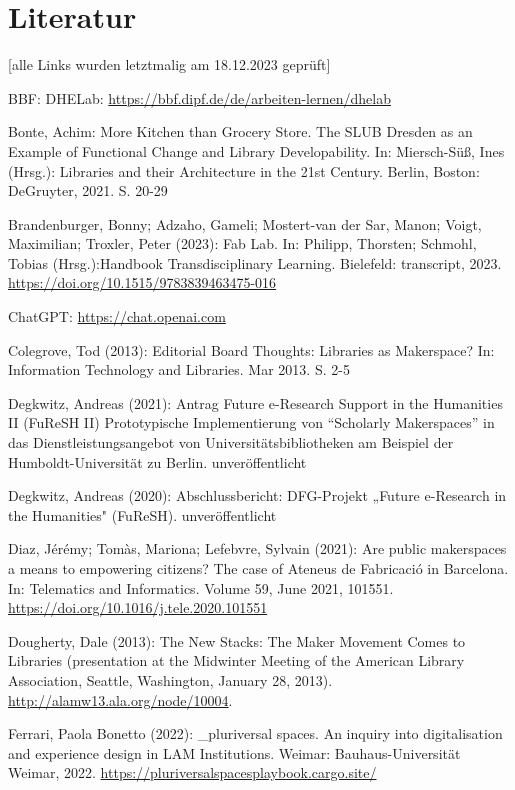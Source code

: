 \documentclass[a4paper,
fontsize=11pt,
oneside,
numbers=noperiodatend,
parskip=half-,
bibliography=totoc,
final
]{scrartcl}
\begin{document}
\hypertarget{literatur}{%
\section{Literatur}\label{literatur}}

{[}alle Links wurden letztmalig am 18.12.2023 geprüft{]}

BBF: DHELab: \url{https://bbf.dipf.de/de/arbeiten-lernen/dhelab}

Bonte, Achim: More Kitchen than Grocery Store. The SLUB Dresden as an
Example of Functional Change and Library Developability. In:
Miersch-Süß, Ines (Hrsg.): Libraries and their Architecture in the 21st
Century. Berlin, Boston: DeGruyter, 2021. S. 20-29

Brandenburger, Bonny; Adzaho, Gameli; Mostert-van der Sar, Manon; Voigt,
Maximilian; Troxler, Peter (2023): Fab Lab. In: Philipp, Thorsten;
Schmohl, Tobias (Hrsg.):Handbook Transdisciplinary Learning. Bielefeld:
transcript, 2023. \url{https://doi.org/10.1515/9783839463475-016}

Chat\-GPT: \url{https://chat.openai.com}

Colegrove, Tod (2013): Editorial Board Thoughts: Libraries as
Makerspace? In: Information Technology and Libraries. Mar 2013. S. 2-5

Degkwitz, Andreas (2021): Antrag Future e-Research Support in the
Humanities II (FuReSH II) Prototypische Implementierung von
\enquote{Scholarly Makerspaces} in das Dienstleistungsangebot von
Universitätsbibliotheken am Beispiel der Humboldt-Universität zu Berlin.
unveröffentlicht

Degkwitz, Andreas (2020): Abschlussbericht: DFG-Projekt „Future
e-Research in the Humanities" (FuReSH). unveröffentlicht

Diaz, Jérémy; Tomàs, Mariona; Lefebvre, Sylvain (2021): Are public
makerspaces a means to empowering citizens? The case of Ateneus de
Fabricació in Barcelona. In: Telematics and Informatics. Volume 59, June
2021, 101551. \url{https://doi.org/10.1016/j.tele.2020.101551}

Dougherty, Dale (2013): The New Stacks: The Maker Movement Comes to
Libraries (presentation at the Midwinter Meeting of the American Library
Association, Seattle, Washington, January 28, 2013).
\url{http://alamw13.ala.org/node/10004}.

Ferrari, Paola Bonetto (2022): \_pluriversal spaces. An inquiry into
digitalisation and experience design in LAM Institutions. Weimar:
Bauhaus-Universität Weimar, 2022.
\url{https://pluriversalspacesplaybook.cargo.site/}
\end{document}
